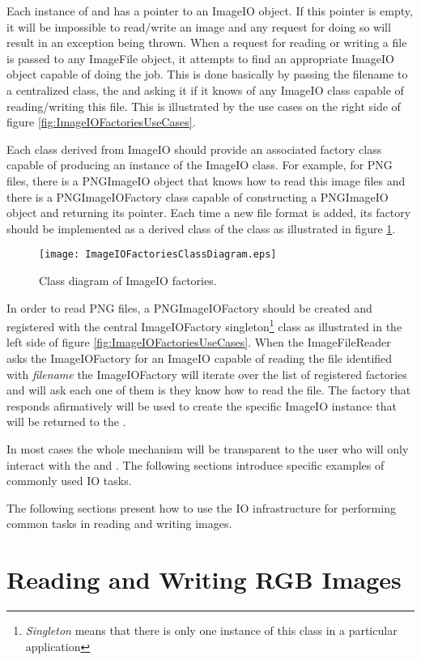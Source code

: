 Each instance of  and 
has a pointer to an ImageIO object. If this pointer is empty, it will be
impossible to read/write an image and any request for doing so will result in
an exception being thrown. When a request for reading or writing a file is
passed to any ImageFile object, it attempts to find an appropriate ImageIO
object capable of doing the job. This is done basically by passing the filename
to a centralized class, the  and asking it if it knows of
any ImageIO class capable of reading/writing this file. This is illustrated by
the use cases on the right side of figure \ref{fig:ImageIOFactoriesUseCases}.

Each class derived from ImageIO should provide an associated factory class
capable of producing an instance of the ImageIO class. For example, for PNG
files, there is a PNGImageIO object that knows how to read this image files
and there is a PNGImageIOFactory class capable of constructing a PNGImageIO
object and returning its pointer. Each time a new file format is added, its
factory should be implemented as a derived class of the 
class as illustrated in figure \ref{fig:ImageIOFactoriesClassDiagram}. 

\begin{figure}
\center
\texttt{[image: ImageIOFactoriesClassDiagram.eps]}
\caption{Class diagram of ImageIO factories.}
\label{fig:ImageIOFactoriesClassDiagram}
\end{figure}

In order to read PNG files, a PNGImageIOFactory should be created and
registered with the central ImageIOFactory singleton\footnote{\emph{Singleton}
means that there is only one instance of this class in a particular
application} class as illustrated in the left side of figure
\ref{fig:ImageIOFactoriesUseCases}. When the ImageFileReader asks the
ImageIOFactory for an ImageIO capable of reading the file identified with
\emph{filename} the ImageIOFactory will iterate over the list of registered
factories and will ask each one of them is they know how to read the file. The
factory that responds afirmatively will be used to create the specific ImageIO
instance that will be returned to the .

In most cases the whole mechanism will be transparent to the user who will only
interact with the  and . The following
sections introduce specific examples of commonly used IO tasks. 

The following sections present how to use the IO infrastructure for performing
common tasks in reading and writing images.


\section{Reading and Writing RGB Images}
\label{sec:RGBImagReadWrite}







